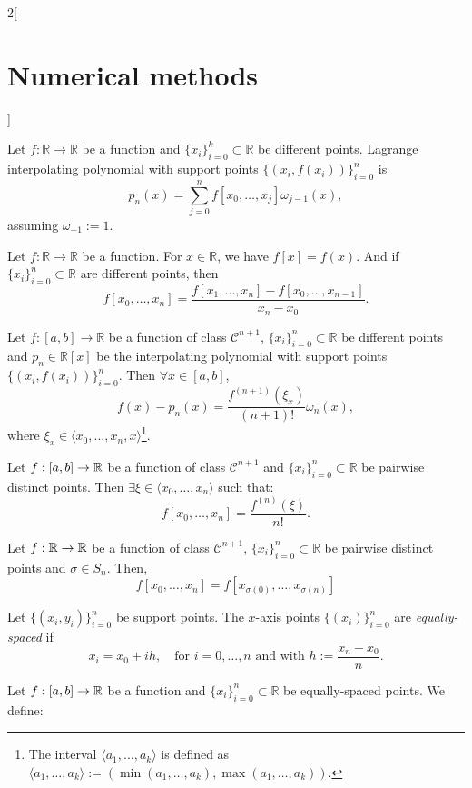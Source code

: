 \documentclass[../../../main.tex]{subfiles}
\begin{document}
\begin{multicols}{2}[\section{Numerical methods}]
\begin{definition}
\end{definition}
\begin{prop}
    Let $f:\mathbb{R}\rightarrow\mathbb{R}$ be a function and $\{x_i\}_{i=0}^k\subset\mathbb{R}$ be different points. Lagrange interpolating polynomial with support points $\{(x_i,f(x_i))\}_{i=0}^n$ is $$p_n(x)=\sum_{j=0}^nf[x_0,\ldots,x_j]\omega_{j-1}(x),$$ assuming $\omega_{-1}:=1$.
\end{prop}
\begin{prop}
    Let $f:\mathbb{R}\rightarrow\mathbb{R}$ be a function. For $x\in\mathbb{R}$, we have $f[x]=f(x)$. And if $\{x_i\}_{i=0}^n\subset\mathbb{R}$ are different points, then $$f[x_0,\ldots,x_n]=\frac{f[x_1,\ldots,x_n]-f[x_0,\ldots,x_{n-1}]}{x_n-x_0}.$$ 
\end{prop}
\begin{theorem}
    Let $f:[a,b]\rightarrow\mathbb{R}$ be a function of class $\mathcal{C}^{n+1}$, $\{x_i\}_{i=0}^n\subset\mathbb{R}$ be different  points and $p_n\in\mathbb{R}[x]$ be the interpolating polynomial with support points $\{(x_i,f(x_i))\}_{i=0}^n$. Then $\forall x\in[a,b]$, $$f(x)-p_n(x)=\frac{f^{(n+1)}(\xi_x)}{(n+1)!}\omega_n(x),$$ where $\xi_x\in\langle x_0,\ldots,x_n,x\rangle$\footnote{The interval $\langle a_1,\ldots,a_k\rangle$ is defined as $\langle a_1,\ldots,a_k\rangle:=(\min(a_1,\ldots,a_k),\max(a_1,\ldots,a_k))$.}.
\end{theorem}
\begin{lemma}
    Let $f:[a,b]\rightarrow\mathbb{R}$ be a function of class $\mathcal{C}^{n+1}$ and $\{x_i\}_{i=0}^n\subset\mathbb{R}$ be pairwise distinct points. Then $\exists\xi\in\langle x_0,\ldots,x_n\rangle$ such that: $$f[x_0,\ldots,x_n]=\frac{f^{(n)}(\xi)}{n!}.$$ 
\end{lemma}
\begin{prop}
    Let $f:\mathbb{R}\rightarrow\mathbb{R}$ be a function of class $\mathcal{C}^{n+1}$, $\{x_i\}_{i=0}^n\subset\mathbb{R}$ be pairwise distinct points and $\sigma\in S_n$. Then, $$f[x_0,\ldots,x_n]=f[x_{\sigma(0)},\ldots,x_{\sigma(n)}]$$
\end{prop}
\begin{definition}
    Let $\{(x_i,y_i)\}_{i=0}^n$ be support points. The $x$-axis points $\{(x_i)\}_{i=0}^n$ are \textit{equally-spaced} if $$x_i=x_0+ih,\quad\text{for }i=0,\ldots,n\text{ and with }h:=\frac{x_n-x_0}{n}.$$
\end{definition}
\begin{definition}
    Let $f:[a,b]\rightarrow\mathbb{R}$ be a function and $\{x_i\}_{i=0}^n\subset\mathbb{R}$ be equally-spaced points. We define:

\end{definition}
\end{multicols}
\end{document}
